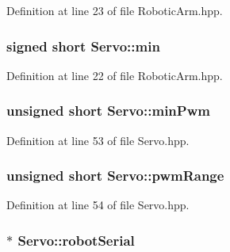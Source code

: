 Definition at line 23 of file Robotic\+Arm.\+hpp.

\subsubsection[{\texorpdfstring{min}{min}}]{\setlength{\rightskip}{0pt plus 5cm}signed short Servo\+::min}\hypertarget{struct_servo_a2fe3506ea048af600250b292275df6e2}{}\label{struct_servo_a2fe3506ea048af600250b292275df6e2}


Definition at line 22 of file Robotic\+Arm.\+hpp.

\subsubsection[{\texorpdfstring{min\+Pwm}{minPwm}}]{\setlength{\rightskip}{0pt plus 5cm}unsigned short Servo\+::min\+Pwm\hspace{0.3cm}{\ttfamily [private]}}\hypertarget{struct_servo_a209ccc691c719c1442f77a0c0ee08fbb}{}\label{struct_servo_a209ccc691c719c1442f77a0c0ee08fbb}


Definition at line 53 of file Servo.\+hpp.

\subsubsection[{\texorpdfstring{pwm\+Range}{pwmRange}}]{\setlength{\rightskip}{0pt plus 5cm}unsigned short Servo\+::pwm\+Range\hspace{0.3cm}{\ttfamily [private]}}\hypertarget{struct_servo_ad3b5b2cb998a334baeb520cecc24be48}{}\label{struct_servo_ad3b5b2cb998a334baeb520cecc24be48}


Definition at line 54 of file Servo.\+hpp.

\subsubsection[{\texorpdfstring{robot\+Serial}{robotSerial}}]{$\ast$ Servo\+::robot\+Serial\hspace{0.3cm}{\ttfamily [private]}}\hypertarget{struct_servo_a07e75a2dc8f979d2d91308da2ae96053}{}\label{struct_servo_a07e75a2dc8f979d2d91308da2ae96053}


